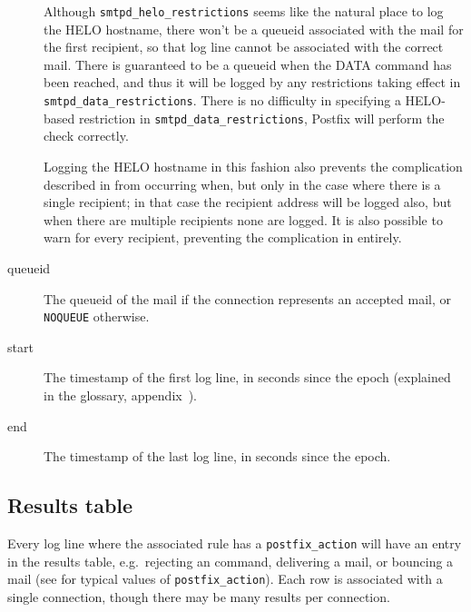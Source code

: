 \begin{description}
\begin{enumerate}
        \end{enumerate}

        Although \texttt{smtpd\_helo\_restrictions} seems like the natural
        place to log the HELO hostname, there won't be a queueid associated
        with the mail for the first recipient, so that log line cannot be
        associated with the correct mail.  There is guaranteed to be a
        queueid when the DATA command has been reached, and thus it will be
        logged by any restrictions taking effect in
        \texttt{smtpd\_data\_restrictions}.  There is no difficulty in
        specifying a HELO-based restriction in
        \texttt{smtpd\_data\_restrictions}, Postfix will perform the check
        correctly.

        Logging the HELO hostname in this fashion also prevents the
        complication described in  from occurring when, but only in the case where there
        is a single recipient; in that case the recipient address will be
        logged also, but when there are multiple recipients none are
        logged.  It is also possible to warn for every recipient,
        preventing the complication in  entirely.

    \item [queueid] The queueid of the mail if the connection represents an
        accepted mail, or \texttt{NOQUEUE} otherwise.

    \item [start] The timestamp of the first log line, in seconds since the
        epoch (explained in the glossary, appendix~).

    \item [end] The timestamp of the last log line, in seconds since the
        epoch.

\end{description}

\subsection{Results table}

\label{results table}

Every log line where the associated rule has a \texttt{postfix\_action}
will have an entry in the results table, e.g.\ rejecting an \SMTP{}
command, delivering a mail, or bouncing a mail (see
 for typical values of
\texttt{postfix\_action}).  Each row is associated with a single
connection, though there may be many results per connection.

